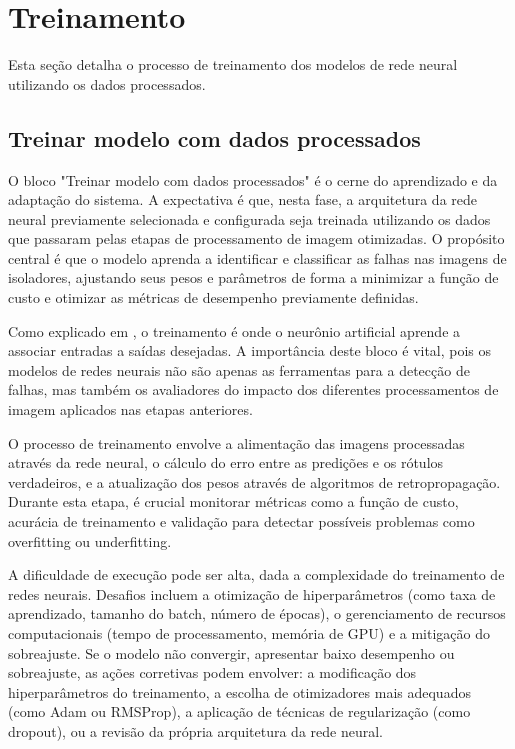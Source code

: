 \section{Treinamento}

Esta seção detalha o processo de treinamento dos modelos de rede neural utilizando os dados processados.

\subsection{Treinar modelo com dados processados}
O bloco "Treinar modelo com dados processados" é o cerne do aprendizado e da adaptação do sistema. A expectativa é que, nesta fase, a arquitetura da rede neural previamente selecionada e configurada seja treinada utilizando os dados que passaram pelas etapas de processamento de imagem otimizadas. O propósito central é que o modelo aprenda a identificar e classificar as falhas nas imagens de isoladores, ajustando seus pesos e parâmetros de forma a minimizar a função de custo e otimizar as métricas de desempenho previamente definidas.

Como explicado em , o treinamento é onde o neurônio artificial aprende a associar entradas a saídas desejadas. A importância deste bloco é vital, pois os modelos de redes neurais não são apenas as ferramentas para a detecção de falhas, mas também os avaliadores do impacto dos diferentes processamentos de imagem aplicados nas etapas anteriores.

O processo de treinamento envolve a alimentação das imagens processadas através da rede neural, o cálculo do erro entre as predições e os rótulos verdadeiros, e a atualização dos pesos através de algoritmos de retropropagação. Durante esta etapa, é crucial monitorar métricas como a função de custo, acurácia de treinamento e validação para detectar possíveis problemas como overfitting ou underfitting.

A dificuldade de execução pode ser alta, dada a complexidade do treinamento de redes neurais. Desafios incluem a otimização de hiperparâmetros (como taxa de aprendizado, tamanho do batch, número de épocas), o gerenciamento de recursos computacionais (tempo de processamento, memória de GPU) e a mitigação do sobreajuste. Se o modelo não convergir, apresentar baixo desempenho ou sobreajuste, as ações corretivas podem envolver: a modificação dos hiperparâmetros do treinamento, a escolha de otimizadores mais adequados (como Adam ou RMSProp), a aplicação de técnicas de regularização (como dropout), ou a revisão da própria arquitetura da rede neural.

